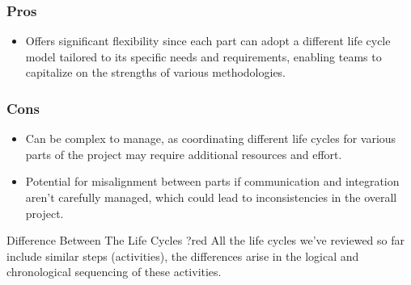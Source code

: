 \subsubsection{Pros}
\begin{itemize} 
\item Offers significant flexibility since each part can adopt a different life cycle model tailored to its specific needs
and requirements, enabling teams to capitalize on the strengths of various methodologies.
\end{itemize}
\subsubsection{Cons}
\begin{itemize}
\item Can be complex to manage, as coordinating different life cycles for various parts of the project may require additional
resources and effort.
\item Potential for misalignment between parts if communication and integration aren’t carefully managed, which could lead
to inconsistencies in the overall project.
\end{itemize}

\vspace{1cm}
\begin{prettyBox}{Difference Between The Life Cycles ?}{red}
All the life cycles we've reviewed so far include similar steps (activities), the differences arise in the logical and
chronological sequencing of these activities.
\end{prettyBox}

